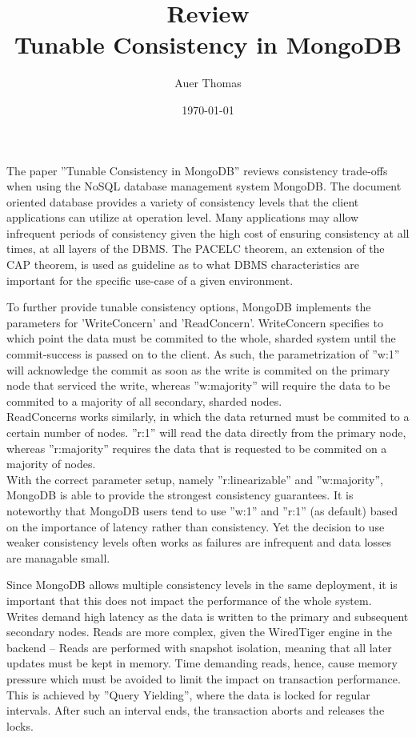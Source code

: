 \documentclass{article}
\title{\textbf{Review}\\Tunable Consistency in MongoDB}
\author{Auer Thomas}
\date{\today}
\begin{document}
\maketitle
\horrule{1pt}

\vspace{2em}

The paper ''Tunable Consistency in MongoDB'' reviews consistency trade-offs when using the NoSQL database management system MongoDB. 
The document oriented database provides a variety of consistency levels that the client applications can utilize at operation level.
Many applications may allow infrequent periods of consistency given the high cost of ensuring consistency at all times, at all layers of the DBMS.  
The PACELC theorem, an extension of the CAP theorem, is used as guideline as to what DBMS characteristics are important for the specific use-case of a given environment.

To further provide tunable consistency options, MongoDB implements the parameters for 'WriteConcern' and 'ReadConcern'. 
WriteConcern specifies to which point the data must be commited to the whole, sharded system until the commit-success is passed on to the client. 
As such, the parametrization of ''w:1'' will acknowledge the commit as soon as the write is commited on the primary node that serviced the write, whereas ''w:majority'' will 
require the data to be commited to a majority of all secondary, sharded nodes.\\
ReadConcerns works similarly, in which the data returned must be commited to a certain number of nodes. ''r:1'' will read the data directly from the primary node,
whereas ''r:majority'' requires the data that is requested to be commited on a majority of nodes.\\
With the correct parameter setup, namely ''r:linearizable'' and ''w:majority'', MongoDB is able to provide the strongest consistency guarantees. It is noteworthy that MongoDB users tend to use ''w:1'' and ''r:1'' (as default) based on the importance of latency rather than consistency. Yet the decision to use weaker consistency levels
often works as failures are infrequent and data losses are managable small. 

Since MongoDB allows multiple consistency levels in the same deployment, it is important that this does not impact the performance of the whole system.\\
Writes demand high latency as the data is written to the primary and subsequent secondary nodes. 
Reads are more complex, given the WiredTiger engine in the backend -- Reads are performed with snapshot isolation, meaning that all later updates must be kept in memory.
Time demanding reads, hence, cause memory pressure which must be avoided to limit the impact on transaction performance. 
This is achieved by ''Query Yielding'', where the data is locked for regular intervals. After such an interval ends, the transaction aborts and releases the locks.
\end{document}
